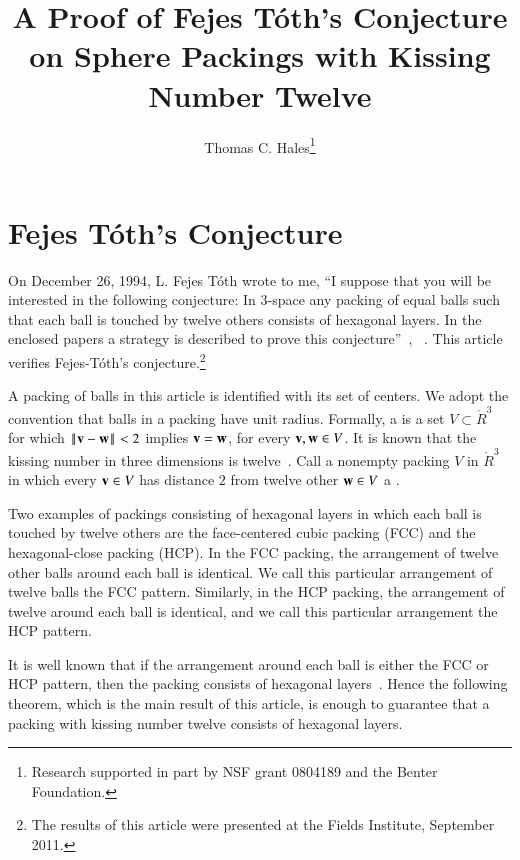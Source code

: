 \documentclass{llncs}
\begin{document}
\title{A Proof of Fejes T\'oth's  Conjecture on Sphere Packings with
Kissing Number Twelve}
\author{Thomas C. Hales\thanks{{Research supported in part by 
NSF grant 0804189 and the Benter Foundation.}}}
\maketitle


\section{Fejes T\'oth's Conjecture}


On December 26, 1994, L. Fejes T\'oth wrote to me, ``I suppose that
you will be interested in the following conjecture: In $3$-space any
packing of equal balls such that each ball is touched by twelve others
consists of hexagonal layers.  In the enclosed papers a strategy is
described to prove this conjecture''~\cite{Fejes-Toth:89},
~\cite{Fejes-Toth:69}.  This article verifies Fejes-T\'oth's
conjecture.\footnote{The results of this article were presented at the
  Fields Institute, September 2011.}


A packing of balls in this article is identified with its set of
centers.  We adopt the convention that balls in a packing have unit
radius.  Formally, a  is a set $V\subset\ring{R}^3$
for which $\norm{\v}{\w} < 2$ implies ${\mathbf v}={\mathbf w}$,
for every ${\mathbf v},{\mathbf w}\in V$.  It is known that the kissing number
in three dimensions is twelve~\cite{Leech:1956:MG}.  Call a nonempty
packing $V$ in $\ring{R}^3$ in which every ${\mathbf v}\in V$ has distance $2$
from twelve other ${\mathbf w}\in V$ a .  

Two examples of packings consisting of hexagonal layers in which each
ball is touched by twelve others are the face-centered cubic packing
(FCC) and the hexagonal-close packing (HCP).  In the FCC packing, the
arrangement of twelve other balls around each ball is identical.  We
call this particular arrangement of twelve balls the FCC pattern.
Similarly, in the HCP packing, the arrangement of twelve around each
ball is identical, and we call this particular arrangement the HCP
pattern.


It is well known that if the arrangement around each ball is either
the FCC or HCP pattern, then the packing consists of hexagonal
layers~\cite[Sec.~1.3]{DSP}.  Hence the following theorem, which is
the main result of this article, is enough to guarantee that a packing
with kissing number twelve consists of hexagonal layers.
\end{document}
